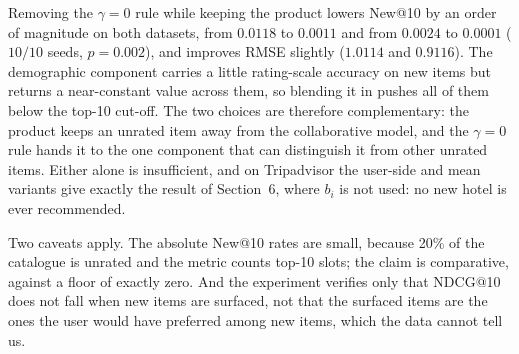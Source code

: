 Removing the $\gamma = 0$ rule while keeping the product lowers New@10 by an order of magnitude on both datasets, from $0.0118$ to $0.0011$ and from $0.0024$ to $0.0001$ ($10/10$ seeds, $p = 0.002$), and improves RMSE slightly ($1.0114$ and $0.9116$). The demographic component carries a little rating-scale accuracy on new items but returns a near-constant value across them, so blending it in pushes all of them below the top-10 cut-off. The two choices are therefore complementary: the product keeps an unrated item away from the collaborative model, and the $\gamma = 0$ rule hands it to the one component that can distinguish it from other unrated items. Either alone is insufficient, and on Tripadvisor the user-side and mean variants give exactly the result of Section~6, where $b_i$ is not used: no new hotel is ever recommended.

Two caveats apply. The absolute New@10 rates are small, because 20\% of the catalogue is unrated and the metric counts top-10 slots; the claim is comparative, against a floor of exactly zero. And the experiment verifies only that NDCG@10 does not fall when new items are surfaced, not that the surfaced items are the ones the user would have preferred among new items, which the data cannot tell us.
